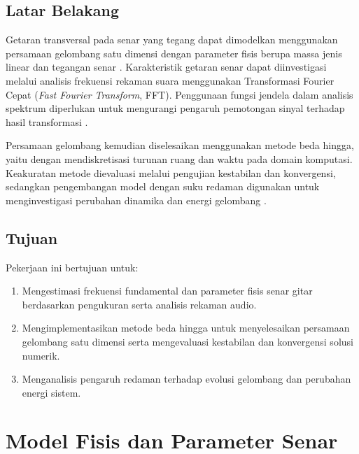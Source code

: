 \documentclass[aps,prl,twocolumn,superscriptaddress]{revtex4-2}
\begin{document}
    \subsection{Latar Belakang}

        Getaran transversal pada senar yang tegang dapat dimodelkan
        menggunakan persamaan gelombang satu dimensi dengan parameter
        fisis berupa massa jenis linear dan tegangan senar
        \cite{BillinghamKing2000}. Karakteristik getaran senar dapat
        diinvestigasi melalui analisis frekuensi rekaman suara menggunakan
        Transformasi Fourier Cepat (\textit{Fast Fourier Transform},
        FFT). Penggunaan fungsi jendela dalam analisis spektrum diperlukan
        untuk mengurangi pengaruh pemotongan sinyal terhadap hasil
        transformasi \cite{Harris1978}.

        Persamaan gelombang kemudian diselesaikan menggunakan metode
        beda hingga, yaitu dengan mendiskretisasi turunan ruang dan
        waktu pada domain komputasi. Keakuratan metode dievaluasi melalui
        pengujian kestabilan dan konvergensi, sedangkan pengembangan
        model dengan suku redaman digunakan untuk menginvestigasi
        perubahan dinamika dan energi gelombang
        \cite{LeVeque2007}.

    \subsection{Tujuan}

        Pekerjaan ini bertujuan untuk:
        \begin{enumerate}
            \item Mengestimasi frekuensi fundamental dan parameter fisis
            senar gitar berdasarkan pengukuran serta analisis rekaman audio.

            \item Mengimplementasikan metode beda hingga untuk
            menyelesaikan persamaan gelombang satu dimensi serta
            mengevaluasi kestabilan dan konvergensi solusi numerik.

            \item Menganalisis pengaruh redaman terhadap evolusi gelombang
            dan perubahan energi sistem.
        \end{enumerate}

\section{Model Fisis dan Parameter Senar}
\label{sec:model-fisis}
\end{document}
